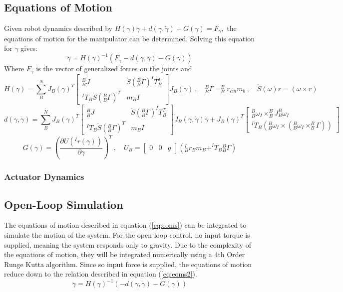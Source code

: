 \subsection{Equations of Motion}
Given robot dynamics described by \(H(\gamma) \ddot{\gamma}+d(\gamma, \dot{\gamma})+G(\gamma)=F_{\gamma},\) the equations of motion for
the manipulator can be determined. Solving this equation for \(\ddot{\gamma}\) gives:
\begin{equation}
  \ddot{\gamma}=H(\gamma)^{-1}\left(F_{\gamma}-d(\gamma, \dot{\gamma})-G(\gamma)\right)
  \label{eq:eoms}
\end{equation}
Where $F_{\gamma}$ is the vector of generalized forces on the joints and
\[
  \renewcommand{\arraystretch}{1.5}
  H(\gamma) = \sum_B^N J_B(\gamma)^T
  \begin{bmatrix}
    ^B_BJ & \mathring{S}(^B_B\Gamma) ^IT_B^T\\
    ^IT_B\mathring{S}(^B_B\Gamma)^T & m_BI
  \end{bmatrix}
  J_B(\gamma)~,\quad
  ^B_B\Gamma = ^B_Br_{cm}m_b~,\quad \mathring{S}(\omega)r=(\omega\times r)
\]
\[
  \renewcommand{\arraystretch}{1.5}
  d(\gamma,\dot{\gamma}) = \sum_B^N J_B(\gamma)^T
  \begin{bmatrix}
    ^B_BJ & \mathring{S}(^B_B\Gamma) ^IT_B^T\\
    ^IT_B\mathring{S}(^B_B\Gamma)^T & m_BI
  \end{bmatrix}
  \dot{J}_B(\gamma,\dot{\gamma})\dot{\gamma}+J_B(\gamma)^T
  \begin{bmatrix}
    ^B_B\omega_I \times ^B_BJ ^B_B\omega_I \\
    ^IT_B\left(^B_B\omega_I\times(^B_B\omega_I\times^B_B\Gamma)\right)
  \end{bmatrix}
\]
\[
G(\gamma) = \left(\frac{\partial U(^Ir(\gamma))}{\partial\gamma}\right)^T~,\quad U_B = \begin{bmatrix} 0 & 0 & g\end{bmatrix}\left(^I_Br_Bm_B + ^IT_B{}_B^B\Gamma\right)
\]
\subsubsection{Actuator Dynamics}


\subsection{Open-Loop Simulation}
The equations of motion described in equation (\ref{eq:eoms}) can be integrated to simulate the motion of the system. For the open loop control, no input torque is supplied, meaning the system responds only to gravity. Due to the complexity of the equations of motion, they will be integrated numerically using a 4th Order Runge Kutta algorithm. Since so input force is supplied, the equations of motion reduce down to the relation described in equation (\ref{eq:eoms2}).
\begin{equation}
\ddot{\gamma}=H(\gamma)^{-1}(-d(\gamma, \dot{\gamma})-G(\gamma))
\label{eq:eoms2}
\end{equation}

